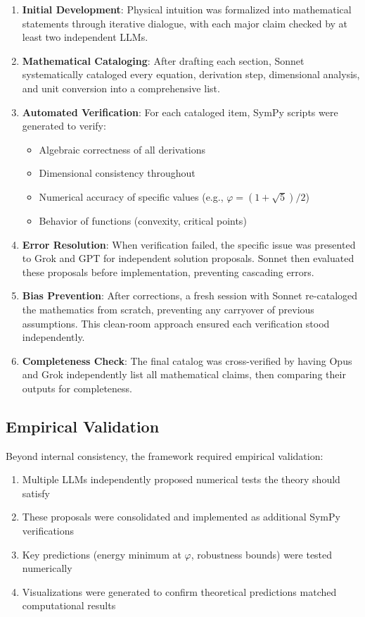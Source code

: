 \begin{enumerate}
\item \textbf{Initial Development}: Physical intuition was formalized into mathematical statements through iterative dialogue, with each major claim checked by at least two independent LLMs.

\item \textbf{Mathematical Cataloging}: After drafting each section, Sonnet systematically cataloged every equation, derivation step, dimensional analysis, and unit conversion into a comprehensive list.

\item \textbf{Automated Verification}: For each cataloged item, SymPy scripts were generated to verify:
   \begin{itemize}
   \item Algebraic correctness of all derivations
   \item Dimensional consistency throughout
   \item Numerical accuracy of specific values (e.g., $\varphi = (1+\sqrt{5})/2$)
   \item Behavior of functions (convexity, critical points)
   \end{itemize}

\item \textbf{Error Resolution}: When verification failed, the specific issue was presented to Grok and GPT for independent solution proposals. Sonnet then evaluated these proposals before implementation, preventing cascading errors.

\item \textbf{Bias Prevention}: After corrections, a fresh session with Sonnet re-cataloged the mathematics from scratch, preventing any carryover of previous assumptions. This clean-room approach ensured each verification stood independently.

\item \textbf{Completeness Check}: The final catalog was cross-verified by having Opus and Grok independently list all mathematical claims, then comparing their outputs for completeness.
\end{enumerate}

\subsection{Empirical Validation}
Beyond internal consistency, the framework required empirical validation:

\begin{enumerate}
\item Multiple LLMs independently proposed numerical tests the theory should satisfy
\item These proposals were consolidated and implemented as additional SymPy verifications
\item Key predictions (energy minimum at $\varphi$, robustness bounds) were tested numerically
\item Visualizations were generated to confirm theoretical predictions matched computational results
\end{enumerate}

